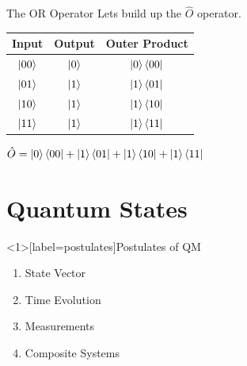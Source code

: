 \documentclass{beamer}
\begin{document}
\begin{frame}{The OR Operator}
    Lets build up the $\hat{O}$ operator.\vfill
    \begin{center}
        
    \begin{tabular}{| c | c | c |}
        \hline
         Input & Output & Outer Product \\
         \hline
         $\ket{00}$ & $\ket{0}$ & $\ket{0}\bra{00}$\\
         $\ket{01}$ & $\ket{1}$ & $\ket{1}\bra{01}$\\
         $\ket{10}$ & $\ket{1}$ & $\ket{1}\bra{10}$\\
         $\ket{11}$ & $\ket{1}$ & $\ket{1}\bra{11}$\\
         \hline
    \end{tabular}
    \vfill
    \begin{math}
        \hat{O} = \ket{0}\bra{00} + \ket{1}\bra{01} + \ket{1}\bra{10} + \ket{1}\bra{11}
    \end{math}
    \end{center}
\end{frame}


\section{Quantum States}

\begin{frame}<1>[label=postulates]{Postulates of QM}
    \begin{enumerate}
        \item<alert@1> State Vector
        \item<alert@2> Time Evolution
        \item<alert@3> Measurements
        \item<alert@4> Composite Systems
    \end{enumerate}
    
\end{frame}
\end{document}
